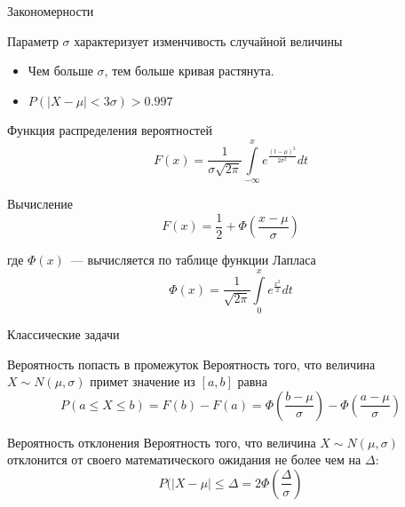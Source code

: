 \documentclass[unicode,11pt,notheorems,xcolor=table]{beamer}
\begin{document}
\begin{frame}{Закономерности}
    \begin{block}{}
        Параметр $\sigma$ характеризует изменчивость случайной величины 
    \end{block}
    \begin{itemize}
    \item  Чем больше $\sigma$, тем больше кривая растянута. 
    \item 
         $\displaystyle P(|X-\mu| < 3\sigma )> 0.997$
    \end{itemize}
\end{frame}

\begin{frame}{Функция  распределения вероятностей}
    $$
        F(x) = \frac{1}{\sigma \sqrt{2\pi}} \int\limits_{-\infty}^x
    e^{\tfrac{(t-\mu)^2}{2\sigma^2}}dt 
    $$        

    \begin{block}{Вычисление}
        $$
        F(x) = \frac{1}{2}+ \Phi \left(\frac{x-\mu}{\sigma}\right)
        $$
    \end{block}
    где $\Phi(x)$~--- вычисляется по таблице функции Лапласа
    $$
    \Phi(x) = \frac{1}{\sqrt{2\pi}} \int\limits_0^x
    e^{\tfrac{x^2}{2}}dt 
    $$

\end{frame}

\begin{frame}{Классические задачи}
    \begin{block}{Вероятность попасть в промежуток}
        Вероятность того, что величина $X\sim N(\mu,\sigma)$ примет значение из $[a,b]$ равна
        $$
        P(a\leqslant X \leqslant b) = F(b)-F(a) = \Phi \left( \frac{b-\mu}{\sigma}\right)- \Phi \left( \frac{a-\mu}{\sigma}\right)
        $$
    \end{block}
    \begin{block}{Вероятность отклонения} 
        Вероятность того, что величина $X\sim N(\mu,\sigma)$ отклонится от своего математического ожидания не более чем на $\Delta$:
        $$
        P(|X-\mu| \leqslant \Delta = 2 \Phi \left( \frac{\Delta}{\sigma}\right)
        $$
    \end{block}

\end{frame}
\end{document}
